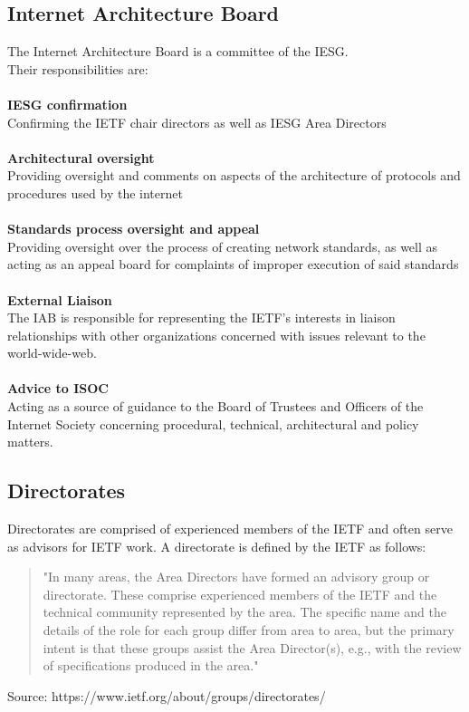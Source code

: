 \documentclass[a4paper,english]{report}
\begin{document}
\subsection{Internet Architecture Board}
The Internet Architecture Board is a committee of the IESG.\\
Their responsibilities are:\\\\
\textbf{IESG confirmation}\\
Confirming the IETF chair directors as well as IESG Area Directors\\\\
\textbf{Architectural oversight}\\
 Providing oversight and comments on aspects of the architecture of protocols and procedures used by the internet\\
\\\textbf{Standards process oversight and appeal}\\
Providing oversight over the process of creating network standards, as well as acting as an appeal board for complaints of improper execution of said standards\\
\\\textbf{External Liaison}\\
The IAB is responsible for representing the IETF’s interests in liaison relationships with other organizations concerned with issues relevant to the world-wide-web.\\
\\\textbf{Advice to ISOC }\\
Acting as a source of guidance to the Board of Trustees and Officers of the Internet Society concerning procedural, technical, architectural and policy matters. \\


\subsection{Directorates}
Directorates are comprised of experienced members of the IETF and often serve as advisors for IETF work. A directorate is defined by the IETF as follows:
\begin{quote}
"In many areas, the Area Directors have formed an advisory group or directorate. These comprise experienced members of the IETF and the technical community represented by the area. The specific name and the details of the role for each group differ from area to area, but the primary intent is that these groups assist the Area Director(s), e.g., with the review of specifications produced in the area."
\end{quote}
Source: https://www.ietf.org/about/groups/directorates/
\end{document}
